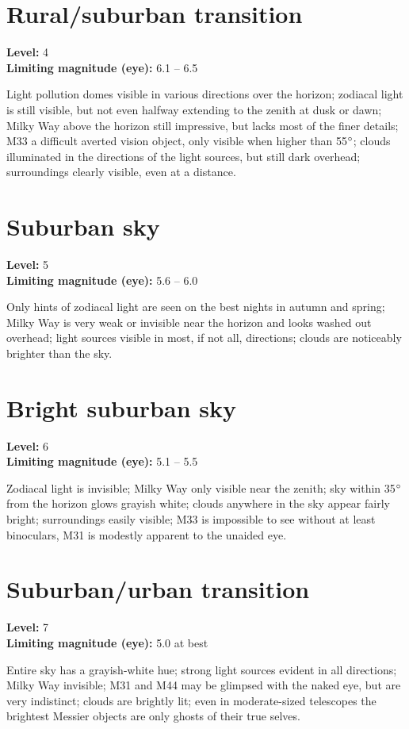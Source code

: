 \section{Rural/suburban transition}
\textbf{Level:} 4 \\
\textbf{Limiting magnitude (eye):} 6.1 -- 6.5

Light pollution domes visible in various directions over the horizon;
zodiacal light is still visible, but not even halfway extending to the
zenith at dusk or dawn; Milky Way above the horizon still impressive,
but lacks most of the finer details; M33 a difficult averted vision
object, only visible when higher than 55$\degree$; clouds illuminated
in the directions of the light sources, but still dark overhead;
surroundings clearly visible, even at a distance.

\section{Suburban sky}
\textbf{Level:} 5 \\
\textbf{Limiting magnitude (eye):} 5.6 -- 6.0

Only hints of zodiacal light are seen on the best nights in autumn and
spring; Milky Way is very weak or invisible near the horizon and looks
washed out overhead; light sources visible in most, if not all,
directions; clouds are noticeably brighter than the sky.

\section{Bright suburban sky}
\textbf{Level:} 6 \\
\textbf{Limiting magnitude (eye):} 5.1 -- 5.5

Zodiacal light is invisible; Milky Way only visible near the zenith;
sky within 35$\degree$ from the horizon glows grayish white; clouds
anywhere in the sky appear fairly bright; surroundings easily visible;
M33 is impossible to see without at least binoculars, M31 is modestly
apparent to the unaided eye.

\section{Suburban/urban transition}
\textbf{Level:} 7 \\
\textbf{Limiting magnitude (eye):} 5.0 at best

Entire sky has a grayish-white hue; strong light sources evident in
all directions; Milky Way invisible; M31 and M44 may be glimpsed with
the naked eye, but are very indistinct; clouds are brightly lit; even
in moderate-sized telescopes the brightest Messier objects are only
ghosts of their true selves.

